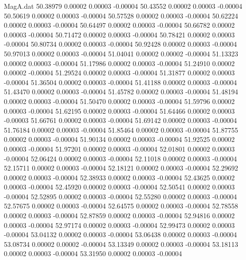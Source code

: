 \begin{filecontents}{MagA.dat}
  50.38979    0.00002    0.00003   -0.00004
  50.43552    0.00002    0.00003   -0.00004
  50.50619    0.00002    0.00003   -0.00004
  50.57528    0.00002    0.00003   -0.00004
  50.62224    0.00002    0.00003   -0.00004
  50.64497    0.00002    0.00003   -0.00004
  50.66782    0.00002    0.00003   -0.00004
  50.71472    0.00002    0.00003   -0.00004
  50.78421    0.00002    0.00003   -0.00004
  50.80734    0.00002    0.00003   -0.00004
  50.92428    0.00002    0.00003   -0.00004
  50.97013    0.00002    0.00003   -0.00004
  51.04041    0.00002    0.00002   -0.00004
  51.13323    0.00002    0.00003   -0.00004
  51.17986    0.00002    0.00003   -0.00004
  51.24910    0.00002    0.00002   -0.00004
  51.29524    0.00002    0.00003   -0.00004
  51.31877    0.00002    0.00003   -0.00004
  51.36504    0.00002    0.00003   -0.00004
  51.41188    0.00002    0.00003   -0.00004
  51.43470    0.00002    0.00003   -0.00004
  51.45782    0.00002    0.00003   -0.00004
  51.48194    0.00002    0.00003   -0.00004
  51.50470    0.00002    0.00003   -0.00004
  51.59796    0.00002    0.00003   -0.00004
  51.62195    0.00002    0.00003   -0.00004
  51.64466    0.00002    0.00003   -0.00003
  51.66761    0.00002    0.00003   -0.00004
  51.69142    0.00002    0.00003   -0.00004
  51.76184    0.00002    0.00003   -0.00004
  51.85464    0.00002    0.00003   -0.00004
  51.87755    0.00002    0.00003   -0.00004
  51.90134    0.00002    0.00003   -0.00004
  51.92525    0.00002    0.00003   -0.00004
  51.97201    0.00002    0.00003   -0.00004
  52.01801    0.00002    0.00003   -0.00004
  52.06424    0.00002    0.00003   -0.00004
  52.11018    0.00002    0.00003   -0.00004
  52.15711    0.00002    0.00003   -0.00004
  52.18121    0.00002    0.00003   -0.00004
  52.29692    0.00002    0.00003   -0.00004
  52.38933    0.00002    0.00003   -0.00004
  52.43625    0.00002    0.00003   -0.00004
  52.45920    0.00002    0.00003   -0.00004
  52.50541    0.00002    0.00003   -0.00004
  52.52895    0.00002    0.00003   -0.00004
  52.55280    0.00002    0.00003   -0.00004
  52.57675    0.00002    0.00003   -0.00004
  52.64575    0.00002    0.00003   -0.00004
  52.78558    0.00002    0.00003   -0.00004
  52.87859    0.00002    0.00003   -0.00004
  52.94816    0.00002    0.00003   -0.00004
  52.97174    0.00002    0.00003   -0.00004
  52.99473    0.00002    0.00003   -0.00004
  53.04132    0.00002    0.00003   -0.00004
  53.06438    0.00002    0.00003   -0.00004
  53.08734    0.00002    0.00002   -0.00004
  53.13349    0.00002    0.00003   -0.00004
  53.18113    0.00002    0.00003   -0.00004
  53.31950    0.00002    0.00003   -0.00004

\end{filecontents}
